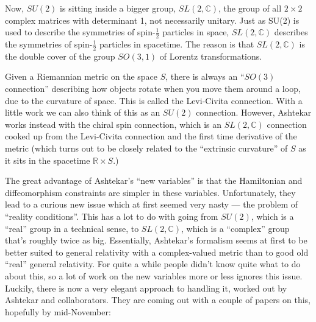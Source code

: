 \documentclass{article}
\renewcommand{\texttt}[1]{%
  \begingroup
  \ttfamily
  \begingroup\lccode`~=`/\lowercase{\endgroup\def~}{/\discretionary{}{}{}}%
  \begingroup\lccode`~=`[\lowercase{\endgroup\def~}{[\discretionary{}{}{}}%
  \begingroup\lccode`~=`.\lowercase{\endgroup\def~}{.\discretionary{}{}{}}%
  \catcode`/=\active\catcode`[=\active\catcode`.=\active
  \scantokens{#1\noexpand}%
  \endgroup
}
\begin{document}
Now, \(SU(2)\) is sitting inside a bigger group, \(SL(2,\mathbb{C})\),
the group of all \(2\times2\) complex matrices with determinant 1, not
necessarily unitary. Just as SU(2) is used to describe the symmetries of
spin-\(\frac12\) particles in space, \(SL(2,\mathbb{C})\) describes the
symmetries of spin-\(\frac12\) particles in spacetime. The reason is
that \(SL(2,\mathbb{C})\) is the double cover of the group \(SO(3,1)\)
of Lorentz transformations.

Given a Riemannian metric on the space \(S\), there is always an
``\(SO(3)\) connection'' describing how objects rotate when you move
them around a loop, due to the curvature of space. This is called the
Levi-Civita connection. With a little work we can also think of this as
an \(SU(2)\) connection. However, Ashtekar works instead with the chiral
spin connection, which is an \(SL(2,\mathbb{C})\) connection cooked up
from the Levi-Civita connection and the first time derivative of the
metric (which turns out to be closely related to the ``extrinsic
curvature'' of \(S\) as it sits in the spacetime
\(\mathbb{R} \times S\).)

The great advantage of Ashtekar's ``new variables'' is that the
Hamiltonian and diffeomorphism constraints are simpler in these
variables. Unfortunately, they lead to a curious new issue which at
first seemed very nasty --- the problem of ``reality conditions''. This
has a lot to do with going from \(SU(2)\), which is a ``real'' group in
a technical sense, to \(SL(2,\mathbb{C})\), which is a ``complex'' group
that's roughly twice as big. Essentially, Ashtekar's formalism seems at
first to be better suited to general relativity with a complex-valued
metric than to good old ``real'' general relativity. For quite a while
people didn't know quite what to do about this, so a lot of work on the
new variables more or less ignores this issue. Luckily, there is now a
very elegant approach to handling it, worked out by Ashtekar and
collaborators. They are coming out with a couple of papers on this,
hopefully by mid-November:

\end{document}
